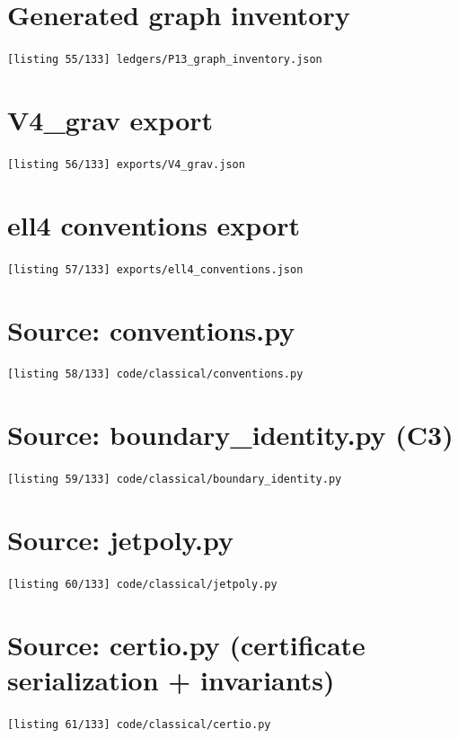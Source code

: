 \section{Generated graph inventory}
\noindent\texttt{[listing 55/133] ledgers/P13\_graph\_inventory.json}
{\scriptsize}

\section{V4\_grav export}
\noindent\texttt{[listing 56/133] exports/V4\_grav.json}
{\scriptsize}

\section{ell4 conventions export}
\noindent\texttt{[listing 57/133] exports/ell4\_conventions.json}
{\scriptsize}

\section{Source: conventions.py}
\noindent\texttt{[listing 58/133] code/classical/conventions.py}
{\scriptsize}

\section{Source: boundary\_identity.py (C3)}
\noindent\texttt{[listing 59/133] code/classical/boundary\_identity.py}
{\scriptsize}

\section{Source: jetpoly.py}
\noindent\texttt{[listing 60/133] code/classical/jetpoly.py}
{\scriptsize}

\section{Source: certio.py (certificate serialization + invariants)}
\noindent\texttt{[listing 61/133] code/classical/certio.py}
{\scriptsize}

